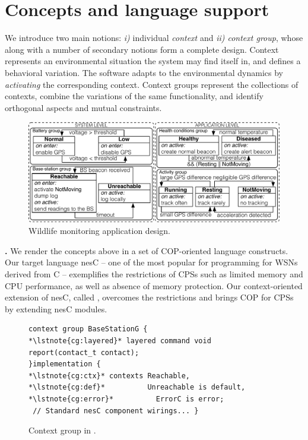 \section{Concepts and language support}

We introduce two main notions: \emph{i)} individual \emph{context} and \emph{ii)
context group}, whose along with a number of secondary notions form a complete
design. Context represents an environmental situation the system may find itself
in, and defines a behavioral variation. The software adapts to the environmental
dynamics by \emph{activating} the corresponding context. Context groups
represent the collections of contexts, combine the variations of the same
functionality, and identify orthogonal aspects and mutual constraints.

\begin{figure}
\begin{center}
\includegraphics[scale=.45]{imgs/wildlifetracking}
\vspace{-1mm}
\caption{Wildlife monitoring application design.}
  \label{fig:design}
\vspace{-7mm}
\end{center}
\end{figure}

{\bf \conesc.} We render the concepts above in a set of COP-oriented language
constructs. Our target language nesC -- one of the most popular for programming
for WSNs derived from C -- exemplifies the restrictions of CPSs such as limited
memory and CPU performance, as well as absence of memory protection. Our
context-oriented extension of nesC, called \conesc, overcomes the restrictions
and brings COP for CPSs by extending nesC modules.

\begin{figure}[!tb]
\begin{lstlisting}[style=conescframe]
context group BaseStationG {
*\lstnote{cg:layered}* layered command void report(contact_t contact);
}implementation {
*\lstnote{cg:ctx}* contexts Reachable, 
*\lstnote{cg:def}*          Unreachable is default,
*\lstnote{cg:error}*          ErrorC is error;
 // Standard nesC component wirings... }
\end{lstlisting}
\vspace{-3mm}
\caption{Context group in \conesc.}
  \label{fig:configuration}
\vspace{-7mm}
\end{figure}

